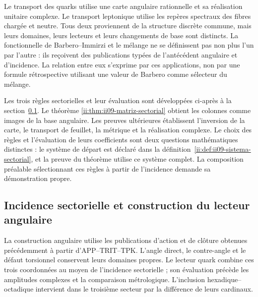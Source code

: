 Le transport des quarks utilise une carte angulaire rationnelle et sa réalisation
unitaire complexe. Le transport leptonique utilise les repères spectraux
des fibres chargée et neutre. Tous deux proviennent de la structure discrète
commune, mais leurs domaines, leurs lecteurs et leurs changements de base sont distincts.
La fonctionnelle de Barbero--Immirzi et le mélange ne se définissent pas non plus l'un par
l'autre : ils reçoivent des publications typées de l'antécédent angulaire et d'incidence.
La relation entre eux s'exprime par ces applications, non par une
formule rétrospective utilisant une valeur de Barbero comme sélecteur du mélange.

\begin{remark}
Les trois règles sectorielles et leur évaluation sont développées ci-après
à la section~\ref{ii:sec:ii09-construccion-sectorial}. Le théorème
\ref{ii:thm:ii09-matriz-sectorial} obtient les colonnes comme images de la
base angulaire. Les preuves ultérieures établissent l'inversion de la carte,
le transport de feuillet, la métrique et la réalisation complexe.
Le choix des règles et l'évaluation de leurs coefficients sont deux
questions mathématiques distinctes : le système de départ est déclaré dans la
définition~\ref{ii:def:ii09-sistema-sectorial}, et la preuve du théorème
utilise ce système complet. La composition préalable sélectionnant ces
règles à partir de l'incidence demande sa démonstration propre.
\end{remark}



\subsection{Incidence sectorielle et construction du lecteur angulaire}
\label{ii:sec:ii09-construccion-sectorial}

La construction angulaire utilise les publications d'action et de clôture
obtenues précédemment à partir d'APP--TRIT--TPK. L'angle direct, le
contre-angle et le défaut torsionnel conservent leurs domaines propres.
Le lecteur quark combine ces trois coordonnées au moyen de l'incidence
sectorielle ; son évaluation précède les amplitudes complexes et la
comparaison métrologique. L'inclusion hexadique--octadique intervient dans
le troisième secteur par la différence de leurs cardinaux.


